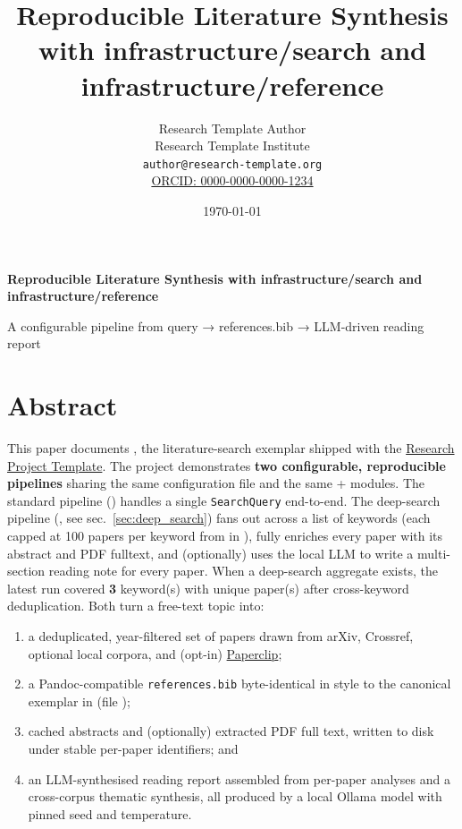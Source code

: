 \documentclass[
]{article}
\author{}
\date{}
\title{Reproducible Literature Synthesis with infrastructure/search and infrastructure/reference}
\author{Research Template Author\\\footnotesize{Research Template Institute}\\\footnotesize{\texttt{author@research-template.org}}\\\footnotesize{\href{https://orcid.org/0000-0000-0000-1234}{ORCID: 0000-0000-0000-1234}}}
\date{\today}
\providecommand{\tightlist}{%
  \setlength{\itemsep}{0pt}\setlength{\parskip}{0pt}}
\begin{document}
\begin{titlepage}
\centering
\vspace*{2cm}
{\LARGE\bfseries Reproducible Literature Synthesis with infrastructure/search and infrastructure/reference\par}
\vspace{0.75em}
{\large A configurable pipeline from query → references.bib → LLM-driven reading report\par}
\vfill
\makeatletter
{\@author\par}
\vspace{1em}
{\@date\par}
\makeatother
\vfill
\end{titlepage}
\thispagestyle{empty}
\tableofcontents
\newpage


\section{Abstract}\label{sec:abstract}

This paper documents , the
literature-search exemplar shipped with the
\href{https://github.com/docxology/template}{Research Project Template}.
The project demonstrates \textbf{two configurable, reproducible
pipelines} sharing the same configuration file and the same
 + 
modules. The standard pipeline
() handles a single
\texttt{SearchQuery} end-to-end. The deep-search pipeline
(, see sec.~\ref{sec:deep_search})
fans out across a list of keywords (each capped at 100 papers per
keyword from  in
), fully enriches every paper with its
abstract and PDF fulltext, and (optionally) uses the local LLM to write
a multi-section reading note for every paper. When a deep-search
aggregate exists, the latest run covered \textbf{3} keyword(s) with
\textbf{} unique paper(s) after cross-keyword deduplication. Both turn a
free-text topic into:

\begin{enumerate}
\def\labelenumi{\arabic{enumi}.}
\tightlist
\item
  a deduplicated, year-filtered set of papers drawn from arXiv,
  Crossref, optional local corpora, and (opt-in)
  \href{https://paperclip.gxl.ai/}{Paperclip};
\item
  a Pandoc-compatible \texttt{references.bib} byte-identical in style to
  the canonical exemplar in
  \href{../../template_code_project/manuscript/references.bib}{}
  (file );
\item
  cached abstracts and (optionally) extracted PDF full text, written to
  disk under stable per-paper identifiers; and
\item
  an LLM-synthesised reading report assembled from per-paper analyses
  and a cross-corpus thematic synthesis, all produced by a local Ollama
  model with pinned seed and temperature.
\end{enumerate}
\end{document}
